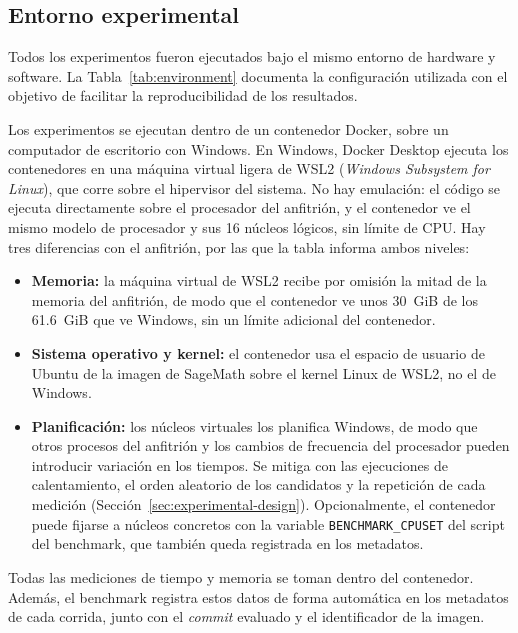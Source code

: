 \subsection{Entorno experimental}
\label{sec:experimental-environment}

Todos los experimentos fueron ejecutados bajo el mismo entorno de hardware y software.
La Tabla~\ref{tab:environment} documenta la configuración utilizada con el objetivo de
facilitar la reproducibilidad de los resultados.

Los experimentos se ejecutan dentro de un contenedor Docker, sobre un computador de escritorio con Windows. En Windows, Docker Desktop ejecuta los contenedores en una máquina virtual ligera de WSL2 (\textit{Windows Subsystem for Linux}), que corre sobre el hipervisor del sistema. No hay emulación: el código se ejecuta directamente sobre el procesador del anfitrión, y el contenedor ve el mismo modelo de procesador y sus 16 núcleos lógicos, sin límite de CPU. Hay tres diferencias con el anfitrión, por las que la tabla informa ambos niveles:
\begin{itemize}
    \item \textbf{Memoria:} la máquina virtual de WSL2 recibe por omisión la mitad de la memoria del anfitrión, de modo que el contenedor ve unos 30~GiB de los 61.6~GiB que ve Windows, sin un límite adicional del contenedor.
    \item \textbf{Sistema operativo y kernel:} el contenedor usa el espacio de usuario de Ubuntu de la imagen de SageMath sobre el kernel Linux de WSL2, no el de Windows.
    \item \textbf{Planificación:} los núcleos virtuales los planifica Windows, de modo que otros procesos del anfitrión y los cambios de frecuencia del procesador pueden introducir variación en los tiempos. Se mitiga con las ejecuciones de calentamiento, el orden aleatorio de los candidatos y la repetición de cada medición (Sección~\ref{sec:experimental-design}). Opcionalmente, el contenedor puede fijarse a núcleos concretos con la variable \texttt{BENCHMARK\_CPUSET} del script del benchmark, que también queda registrada en los metadatos.
\end{itemize}
Todas las mediciones de tiempo y memoria se toman dentro del contenedor. Además, el benchmark registra estos datos de forma automática en los metadatos de cada corrida, junto con el \textit{commit} evaluado y el identificador de la imagen.

